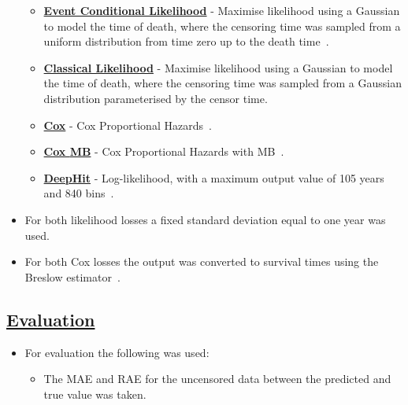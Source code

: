 \documentclass[landscape, color=UCLburgundy, margin=1cm]{uclposter}
\begin{document}
\begin{multicols}{2}
\begin{multicols}{2}
\begin{itemize}
                        \begin{itemize}
                            \item \underline{\textbf{Event Conditional Likelihood}} - Maximise likelihood using a Gaussian to model the time of death, where the censoring time was sampled from a uniform distribution from time zero up to the death time~\cite{Shahin2023DeepAnalysis}.
                
                            \item \underline{\textbf{Classical Likelihood}} - Maximise likelihood using a Gaussian to model the time of death, where the censoring time was sampled from a Gaussian distribution parameterised by the censor time.
                
                            \item \underline{\textbf{Cox}} - Cox Proportional Hazards~\cite{Cox1972RegressionLife-Tables}.
                
                            \item \underline{\textbf{Cox \gls{MB}}} - Cox Proportional Hazards with \gls{MB}~\cite{Shahin2022SurvivalData}.
                
                            \item \underline{\textbf{DeepHit}} - Log-likelihood, with a maximum output value of 105 years and 840 bins~\cite{Lee2018DeepHit:Risks}.
                        \end{itemize}
                
                        \item For both likelihood losses a fixed standard deviation equal to one year was used.
                        
                        \item For both Cox losses the output was converted to survival times using the Breslow estimator~\cite{Breslow1974CovarianceData}.
                    \end{itemize}

                \subsection*{\underline{\textbf{Evaluation}}}
                    \begin{itemize}
                        \item For evaluation the following was used:
    
                        \begin{itemize}
                            \item The \gls{MAE} and \gls{RAE} for the uncensored data between the predicted and true value was taken.
                            

\end{itemize}
\end{itemize}
\end{multicols}
\end{multicols}
\end{document}

